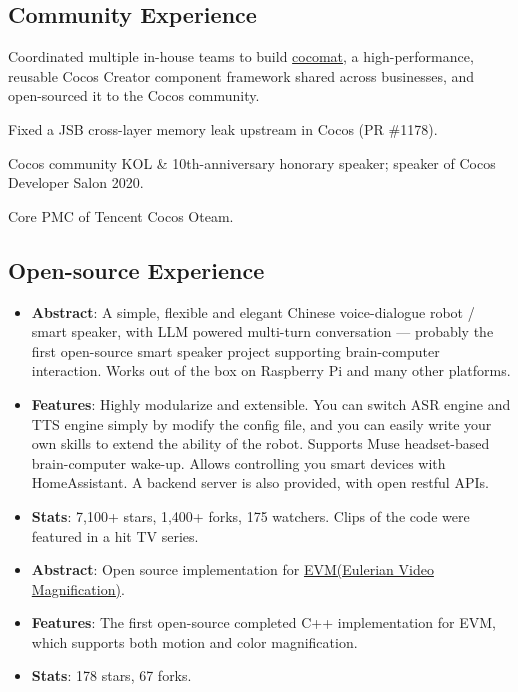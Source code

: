 \subsection{Community Experience}

{
  \begin{tightitemize}%
  \item Coordinated multiple in-house teams to build \href{https://github.com/cocos/cocomat}{cocomat},
    a high-performance, reusable Cocos Creator component framework shared across businesses, and
    open-sourced it to the Cocos community.
  \item Fixed a JSB cross-layer memory leak upstream in Cocos (PR \#1178).
  \item Cocos community KOL \& 10th-anniversary honorary speaker; speaker of Cocos Developer Salon 2020.
  \item Core PMC of Tencent Cocos Oteam.
  \end{tightitemize}}

\subsection{Open-source Experience}

%
  {
\begin{itemize}
\item \textbf{Abstract}: A simple, flexible and elegant Chinese voice-dialogue robot / smart speaker, with LLM powered multi-turn conversation --- probably the first open-source smart speaker project supporting brain-computer interaction. Works out of the box on Raspberry Pi and many other platforms.
\item \textbf{Features}: Highly modularize and extensible. You can switch ASR engine and TTS engine simply by modify the config file, and you can easily write your own skills to extend the ability of the robot. Supports Muse headset-based brain-computer wake-up. Allows controlling you smart devices with HomeAssistant. A backend server is also provided, with open restful APIs.
\item \textbf{Stats}: 7,100+ stars, 1,400+ forks, 175 watchers. Clips of the code were featured in a hit TV series.
\end{itemize}}

%
  {
\begin{itemize}
\item \textbf{Abstract}: Open source implementation for \href{http://people.csail.mit.edu/mrub/vidmag/}{EVM(Eulerian Video Magnification)}.
\item \textbf{Features}: The first open-source completed C++ implementation for EVM, which supports both motion and color magnification.
\item \textbf{Stats}: 178 stars, 67 forks.
\end{itemize}}

